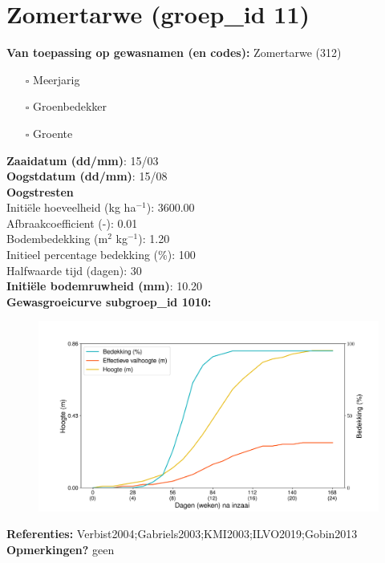 \documentclass{article}
\begin{document}
 \section{Zomertarwe (groep\_id 11)} 
 \textbf{Van toepassing op gewasnamen (en codes):} Zomertarwe (312) 
 \begin{multicols}{3} \begin{itemize} \item[$\square$] Meerjarig \item[$\square$] Groenbedekker \item[$\square$] Groente \end{itemize} \end{multicols} 
  \textbf{Zaaidatum (dd/mm)}: 15/03  \vspace{0.10cm} \\ 
  \textbf{Oogstdatum (dd/mm)}: 15/08  \vspace{0.10cm} \\ 
  \textbf{Oogstresten} \vspace{0.05cm} \\ 
  \tab Initi\"{e}le hoeveelheid (kg ha$^{-1}$): 3600.00 \vspace{0.05cm} \\ 
  \tab Afbraakcoefficient (-): 0.01 \vspace{0.05cm} \\ 
  \tab Bodembedekking (m$^2$ kg$^{-1}$): 1.20 \vspace{0.05cm} \\ 
  \tab Initieel percentage bedekking (\%): 100 \vspace{0.05cm} \\ 
  \tab Halfwaarde tijd (dagen): 30 \vspace{0.05cm} \\ 
  \textbf{Initi\"{e}le bodemruwheid (mm)}: 10.20 \vspace{0.05cm} \\ 
  \textbf{Gewasgroeicurve subgroep\_id 1010:} 
 \begin{center} \begin{figure}[H] \includegraphics[width=12.5cm]{temp/1010.png} \end{figure} \end{center} 
  \textbf{Referenties:} Verbist2004;Gabriels2003;KMI2003;ILVO2019;Gobin2013 \vspace{0.10cm} \\ 
  \textbf{Opmerkingen?} geen \vspace{0.10cm} \\ 
 \newpage 
\end{document}
